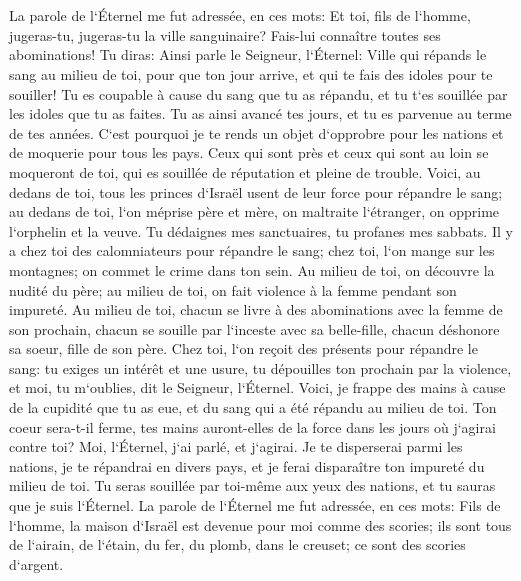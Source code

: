 \chapter{}

\verse La parole de l`Éternel me fut adressée, en ces mots: 
\verse Et toi, fils de l`homme, jugeras-tu, jugeras-tu la ville sanguinaire? Fais-lui connaître toutes ses abominations! 
\verse Tu diras: Ainsi parle le Seigneur, l`Éternel: Ville qui répands le sang au milieu de toi, pour que ton jour arrive, et qui te fais des idoles pour te souiller! 
\verse Tu es coupable à cause du sang que tu as répandu, et tu t`es souillée par les idoles que tu as faites. Tu as ainsi avancé tes jours, et tu es parvenue au terme de tes années. C`est pourquoi je te rends un objet d`opprobre pour les nations et de moquerie pour tous les pays. 
\verse Ceux qui sont près et ceux qui sont au loin se moqueront de toi, qui es souillée de réputation et pleine de trouble. 
\verse Voici, au dedans de toi, tous les princes d`Israël usent de leur force pour répandre le sang; 
\verse au dedans de toi, l`on méprise père et mère, on maltraite l`étranger, on opprime l`orphelin et la veuve. 
\verse Tu dédaignes mes sanctuaires, tu profanes mes sabbats. 
\verse Il y a chez toi des calomniateurs pour répandre le sang; chez toi, l`on mange sur les montagnes; on commet le crime dans ton sein. 
\verse Au milieu de toi, on découvre la nudité du père; au milieu de toi, on fait violence à la femme pendant son impureté. 
\verse Au milieu de toi, chacun se livre à des abominations avec la femme de son prochain, chacun se souille par l`inceste avec sa belle-fille, chacun déshonore sa soeur, fille de son père. 
\verse Chez toi, l`on reçoit des présents pour répandre le sang: tu exiges un intérêt et une usure, tu dépouilles ton prochain par la violence, et moi, tu m`oublies, dit le Seigneur, l`Éternel. 
\verse Voici, je frappe des mains à cause de la cupidité que tu as eue, et du sang qui a été répandu au milieu de toi. 
\verse Ton coeur sera-t-il ferme, tes mains auront-elles de la force dans les jours où j`agirai contre toi? Moi, l`Éternel, j`ai parlé, et j`agirai. 
\verse Je te disperserai parmi les nations, je te répandrai en divers pays, et je ferai disparaître ton impureté du milieu de toi. 
\verse Tu seras souillée par toi-même aux yeux des nations, et tu sauras que je suis l`Éternel. 
\verse La parole de l`Éternel me fut adressée, en ces mots: 
\verse Fils de l`homme, la maison d`Israël est devenue pour moi comme des scories; ils sont tous de l`airain, de l`étain, du fer, du plomb, dans le creuset; ce sont des scories d`argent. 
